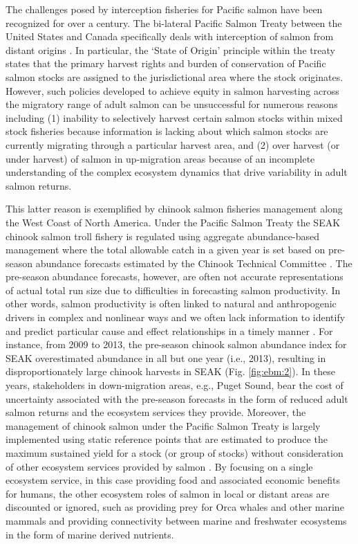 The challenges posed by interception fisheries for Pacific salmon have
been recognized for over a century. The bi-lateral Pacific Salmon Treaty
between the United States and Canada specifically deals with
interception of salmon from distant origins
\citep{Knight2000, Noakes2005b}. In particular, the `State of Origin'
principle within the treaty states that the primary harvest rights and
burden of conservation of Pacific salmon stocks are assigned to the
jurisdictional area where the stock originates. However, such policies
developed to achieve equity in salmon harvesting across the migratory
range of adult salmon can be unsuccessful for numerous reasons including
(1) inability to selectively harvest certain salmon stocks within mixed
stock fisheries because information is lacking about which salmon stocks
are currently migrating through a particular harvest area, and (2) over
harvest (or under harvest) of salmon in up-migration areas because of an
incomplete understanding of the complex ecosystem dynamics that drive
variability in adult salmon returns.

This latter reason is exemplified by chinook salmon fisheries management along
the West Coast of North America. Under the Pacific Salmon Treaty the SEAK
chinook salmon troll fishery is regulated using aggregate abundance-based
management where the total allowable catch in a given year is set based on
pre-season abundance forecasts estimated by the Chinook Technical Committee
\citep[Annex IV, Chapter 3, Section 6, pg. 66]{PST2014}. The pre-season
abundance forecasts, however, are often not accurate representations of actual
total run size due to difficulties in forecasting salmon productivity. In other
words, salmon productivity is often linked to natural and anthropogenic drivers
in complex and nonlinear ways and we often lack information to identify and
predict particular cause and effect relationships in a timely manner
\citep{Peterman2012, Malick2016a, Myers1998b}. For instance, from 2009 to 2013,
the pre-season chinook salmon abundance index for SEAK overestimated abundance
in all but one year (i.e., 2013), resulting in disproportionately large chinook
harvests in SEAK \citep{CTC2015a} (Fig. \ref{fig:ebm:2}). In these years,
stakeholders in down-migration areas, e.g., Puget Sound, bear the cost of
uncertainty associated with the pre-season forecasts in the form of reduced
adult salmon returns and the ecosystem services they provide. Moreover, the
management of chinook salmon under the Pacific Salmon Treaty is largely
implemented using static reference points that are estimated to produce the
maximum sustained yield for a stock (or group of stocks) without consideration
of other ecosystem services provided by salmon \citep{CTC2015b}. By focusing on
a single ecosystem service, in this case providing food and associated economic
benefits for humans, the other ecosystem roles of salmon in local or distant
areas are discounted or ignored, such as providing prey for Orca whales and
other marine mammals and providing connectivity between marine and freshwater
ecosystems in the form of marine derived nutrients.

